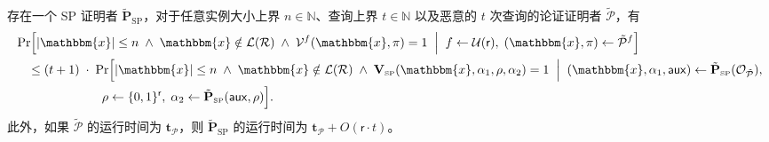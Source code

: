 \documentclass[american,singlepageview]{snargs-book-zh}
\newcommand{\Bits}{\{0,1\}}
\newcommand{\Malicious}[1]{\tilde{#1}}
\newcommand{\AuxiliaryState}{\mathsf{aux}}
\newcommand{\BlackBox}[1]{\mathcal{O}_{#1}}
\newcommand{\SomeSize}[1]{|#1|}
\newcommand{\Naturals}{\mathbb{N}}
\newcommand{\Relation}{\mathcal{R}}
\newcommand{\Language}{\mathcal{L}}
\newcommand{\GetLanguage}[1]{\Language(#1)}
\newcommand{\Instance}{\mathbbm{x}}
\newcommand{\InstanceSize}{n}
\newcommand{\ProtoProver}{P}
\newcommand{\ProtoVerifier}{V}
\newcommand{\ProtoRandomnessComplexity}{\mathsf{r}}
\newcommand{\SPSubscript}{\scriptscriptstyle\mathrm{SP}}
\newcommand{\SPFormat}[1]{\mathbf{#1}}
\newcommand{\SPVerifier}{\SPFormat{\ProtoVerifier}_{\SPSubscript}}
\newcommand{\SPMaliciousProver}{\Malicious{\SPFormat{\ProtoProver}}_{\SPSubscript}}
\newcommand{\SPCommitment}{\alpha_{1}}
\newcommand{\SPChallenge}{\rho}
\newcommand{\SPResponse}{\alpha_{2}}
\newcommand{\SPRandomnessComplexity}{\ProtoRandomnessComplexity}
\newcommand{\ARGFormat}[1]{\mathcal{#1}}
\newcommand{\ARGProver}{\ARGFormat{\ProtoProver}}
\newcommand{\ARGVerifier}{\ARGFormat{\ProtoVerifier}}
\newcommand{\ARGString}{\pi}
\newcommand{\ARGComplexityFormat}[1]{\mathbf{#1}}
\newcommand{\ARGTimeP}{\ARGComplexityFormat{t}_{\scriptscriptstyle\ARGProver}}
\newcommand{\ROFunction}{f}
\newcommand{\ROQueryBound}{t}
\newcommand{\RODistribution}[1]{\mathcal{U}(#1)}
\begin{document}
\begin{lemma}
\label{lemma:fs-for-sigma-protocols-adaptive}
存在一个 SP 证明者 $\SPMaliciousProver$，对于任意实例大小上界 $\InstanceSize \in \Naturals$、查询上界 $\ROQueryBound \in \Naturals$ 以及恶意的 $\ROQueryBound$ 次查询的论证证明者 $\Malicious{\ARGProver}$，有
\begin{align*}
&\Pr\Bigl[
\SomeSize{\Instance} \leq \InstanceSize 
\;\land\;\Instance \notin \GetLanguage{\Relation}
\;\land\;\ARGVerifier^{\ROFunction}(\Instance,\ARGString) = 1
\;\Bigm|\;
\ROFunction \gets \RODistribution{\SPRandomnessComplexity},\;
(\Instance,\ARGString) \gets \Malicious{\ARGProver}^{\ROFunction}
\Bigr]\\
&\quad\leq
(\ROQueryBound+1)\;\cdot\;
\Pr\Bigl[
\SomeSize{\Instance} \leq \InstanceSize
\;\land\;\Instance \notin \GetLanguage{\Relation}
\;\land\;\SPVerifier(\Instance,\SPCommitment,\SPChallenge,\SPResponse)=1
\;\Bigm|\;
(\Instance,\SPCommitment,\AuxiliaryState)\gets\SPMaliciousProver(\BlackBox{\Malicious{\ARGProver}}),\\
&\qquad\qquad\qquad\quad
\SPChallenge\gets\Bits^{\SPRandomnessComplexity},\;
\SPResponse\gets\SPMaliciousProver(\AuxiliaryState,\SPChallenge)
\Bigr].
\end{align*}
此外，如果 $\Malicious{\ARGProver}$ 的运行时间为 $\ARGTimeP$，则 $\SPMaliciousProver$ 的运行时间为
\(\ARGTimeP + O(\SPRandomnessComplexity \cdot \ROQueryBound)\)。
\end{lemma}
\end{document}
